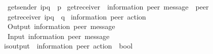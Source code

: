 \begin{isabellebody}
\ \ {\isachardoublequoteopen}get{\isacharunderscore}{\kern0pt}sender\ {\isacharparenleft}{\kern0pt}i\isactrlbsup p{\isasymrightarrow}q\isactrlesup {\isacharparenright}{\kern0pt}\ {\isacharequal}{\kern0pt}\ p{\isachardoublequoteclose}\isanewline
\isanewline
{}\isamarkupfalse%
\ get{\isacharunderscore}{\kern0pt}receiver\ {\isacharcolon}{\kern0pt}{\isacharcolon}{\kern0pt}\ {\isachardoublequoteopen}{\isacharparenleft}{\kern0pt}{\isacharprime}{\kern0pt}information{\isacharcomma}{\kern0pt}\ {\isacharprime}{\kern0pt}peer{\isacharparenright}{\kern0pt}\ message\ {\isasymRightarrow}\ {\isacharprime}{\kern0pt}peer{\isachardoublequoteclose}\ \isanewline
\ \ {\isachardoublequoteopen}get{\isacharunderscore}{\kern0pt}receiver\ {\isacharparenleft}{\kern0pt}i\isactrlbsup p{\isasymrightarrow}q\isactrlesup {\isacharparenright}{\kern0pt}\ {\isacharequal}{\kern0pt}\ q{\isachardoublequoteclose}\isanewline
\isanewline
\isanewline
\isanewline
{}\isamarkupfalse%
\ {\isacharparenleft}{\kern0pt}{\isacharprime}{\kern0pt}information{\isacharcomma}{\kern0pt}\ {\isacharprime}{\kern0pt}peer{\isacharparenright}{\kern0pt}\ action\ {\isacharequal}{\kern0pt}\isanewline
\ \ Output\ {\isachardoublequoteopen}{\isacharparenleft}{\kern0pt}{\isacharprime}{\kern0pt}information{\isacharcomma}{\kern0pt}\ {\isacharprime}{\kern0pt}peer{\isacharparenright}{\kern0pt}\ message{\isachardoublequoteclose}\ \ {\isacharparenleft}{\kern0pt}{\isachardoublequoteopen}{\isacharbang}{\kern0pt}{\isasymlangle}{\isacharunderscore}{\kern0pt}{\isasymrangle}{\isachardoublequoteclose}\ {\isacharbrackleft}{\kern0pt}{}{}{}{\isacharbrackright}{\kern0pt}\ {}{}{}{\isacharparenright}{\kern0pt}\ {\isacharbar}{\kern0pt}\isanewline
\ \ Input\ {\isachardoublequoteopen}{\isacharparenleft}{\kern0pt}{\isacharprime}{\kern0pt}information{\isacharcomma}{\kern0pt}\ {\isacharprime}{\kern0pt}peer{\isacharparenright}{\kern0pt}\ message{\isachardoublequoteclose}\ \ {\isacharparenleft}{\kern0pt}{\isachardoublequoteopen}{\isacharquery}{\kern0pt}{\isasymlangle}{\isacharunderscore}{\kern0pt}{\isasymrangle}{\isachardoublequoteclose}\ {\isacharbrackleft}{\kern0pt}{}{}{}{\isacharbrackright}{\kern0pt}\ {}{}{}{\isacharparenright}{\kern0pt}\isanewline
\isanewline
{}\isamarkupfalse%
\ is{\isacharunderscore}{\kern0pt}output\ {\isacharcolon}{\kern0pt}{\isacharcolon}{\kern0pt}\ {\isachardoublequoteopen}{\isacharparenleft}{\kern0pt}{\isacharprime}{\kern0pt}information{\isacharcomma}{\kern0pt}\ {\isacharprime}{\kern0pt}peer{\isacharparenright}{\kern0pt}\ action\ {\isasymRightarrow}\ bool{\isachardoublequoteclose}\ \isanewline

\end{isabellebody}
